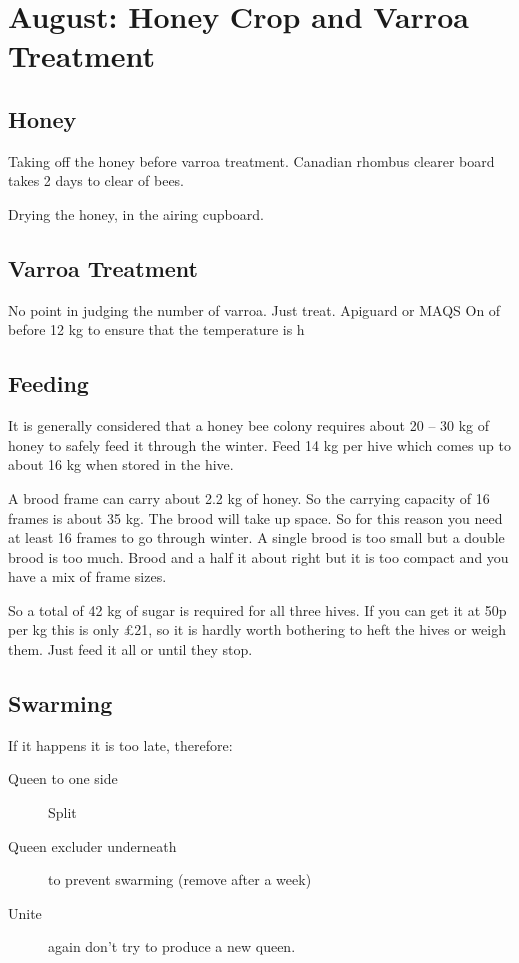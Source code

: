 \section{August: Honey Crop and Varroa Treatment}

\subsection{Honey}

Taking off the honey before varroa treatment.
Canadian rhombus clearer board takes 2 days to clear of bees.

Drying the honey,
in the airing cupboard.

\subsection{Varroa Treatment}

No point in judging the number of varroa.
Just treat.
Apiguard or MAQS
On of before 12 kg to ensure that the temperature is h

\subsection{Feeding}

 It is
generally considered that a honey bee colony requires about 20 – 30 kg of honey to
safely feed it through the winter. 
Feed 14 kg per hive
which comes up to about 16 kg when stored in the hive.

A brood frame can carry about 2.2 kg of honey.  
So the carrying capacity of 16 frames is about 35 kg.
The brood will take up space.
So for this reason you need at least 16 frames to go through winter.
A single brood is too small but a double brood is too much.
Brood and a half it about right but it is too compact
and you have a mix of frame sizes.

 So a total of 42 kg of sugar is required for all three hives.
 If you can get it at 50p per kg this is only £21,
 so it is hardly worth bothering to heft the hives or weigh them.
 Just feed it all or until they stop.
 
 \subsection{Swarming}

 If it happens it is too late, therefore:

 \begin{description}
     \item [Queen to one side] Split
     \item [Queen excluder underneath] to prevent swarming (remove after a week)
     \item [Unite] again don't try to produce a new queen.
 \end{description}

